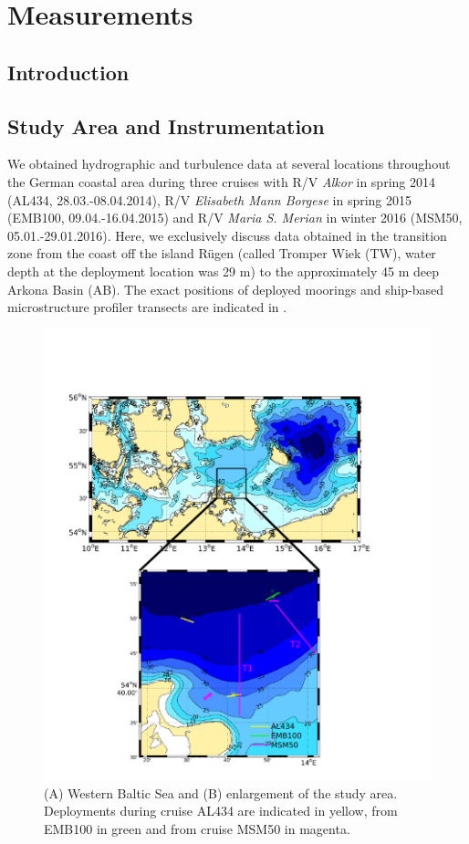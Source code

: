 \chapter{Measurements}
\label{kap-measure}

\section{Introduction}

\section{Study Area and Instrumentation}

We obtained hydrographic and turbulence data at 
several locations throughout the German coastal area during three cruises with 
R/V \textit{Alkor} in spring 2014 (AL434, 28.03.-08.04.2014), R/V 
\textit{Elisabeth Mann Borgese} in spring 2015 (EMB100, 09.04.-16.04.2015) and 
R/V \textit{Maria S. Merian} in winter 2016 (MSM50, 05.01.-29.01.2016). Here, 
we exclusively discuss data obtained in the transition zone from the coast off 
the island R\"{u}gen (called Tromper Wiek (TW), water depth at the deployment 
location was 29 m) to 
the approximately 45 m deep Arkona Basin (AB). The exact positions of deployed 
moorings and ship-based microstructure profiler transects are indicated in 
.
 \begin{figure}[ht]
 \centering
\includegraphics[width=17cm]{bilder/studyarea.pdf}
 \caption{(A) Western Baltic Sea and (B) enlargement of the study area. 
Deployments during cruise AL434 are indicated in yellow, from EMB100 in green 
and from cruise MSM50 in magenta.}
 \label{studyarea}
 \end{figure}

